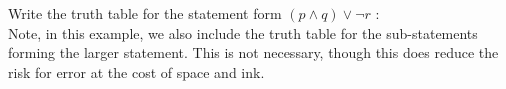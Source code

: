 \guard







\begin{exmp}
\label{exmp:notOrAndTruthTable3}
  Write the truth table for the statement form $(p\wedge q) \vee \neg r$ :\\
  Note, in this example, we also include the truth table for the sub-statements forming the larger statement.
  This is not necessary, though this does reduce the risk for error at the cost of space and ink.
  \begin{center}
    
  \end{center}
\end{exmp}
